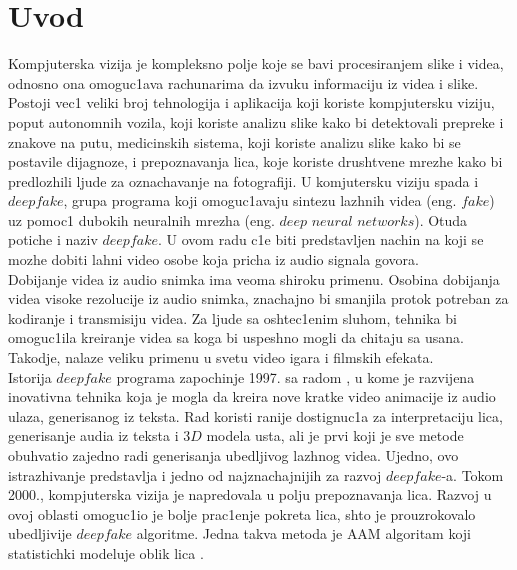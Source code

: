 \documentclass[a4paper, openany, oneside, 11pt]{book}
\begin{document}
\chapter*{Uvod} 
Kompjuterska vizija je kompleksno polje koje se bavi procesiranjem slike i videa, odnosno ona omoguc1ava rachunarima da izvuku informaciju iz videa i slike. Postoji vec1 veliki broj tehnologija i aplikacija koji koriste kompjutersku viziju, poput autonomnih vozila, koji koriste analizu slike kako bi detektovali prepreke i znakove na putu, medicinskih sistema, koji koriste analizu slike kako bi se postavile dijagnoze, i prepoznavanja lica, koje koriste drushtvene mrezhe kako bi predlozhili ljude za oznachavanje na fotografiji. U komjutersku viziju spada i $deepfake$, grupa programa koji omoguc1avaju sintezu lazhnih videa (eng. $fake$) uz pomoc1 dubokih neuralnih mrezha (eng. $deep$ $neural$ $networks$). Otuda potiche i naziv $deepfake$. U ovom radu c1e biti predstavljen nachin na koji se mozhe dobiti lahni video osobe koja pricha iz audio signala govora.\\
Dobijanje videa iz audio snimka ima veoma shiroku primenu. Osobina dobijanja videa visoke rezolucije iz audio snimka, znachajno bi smanjila protok potreban za kodiranje i transmisiju videa. Za ljude sa oshtec1enim sluhom, tehnika bi omoguc1ila kreiranje videa sa koga bi uspeshno mogli da chitaju sa usana. Takodje, nalaze veliku primenu u svetu video igara i filmskih efekata.\\
Istorija $deepfake$ programa zapochinje 1997. sa radom \cite{deepfake1}, u kome je razvijena inovativna tehnika koja je mogla da kreira nove kratke video animacije iz audio ulaza, generisanog iz teksta. Rad koristi ranije dostignuc1a za interpretaciju lica, generisanje audia iz teksta i $3D$ modela usta, ali je prvi koji je sve metode obuhvatio zajedno radi generisanja ubedljivog lazhnog videa. Ujedno, ovo istrazhivanje predstavlja i jedno od najznachajnijih za razvoj $deepfake$-a. Tokom 2000., kompjuterska vizija je napredovala u polju prepoznavanja lica. Razvoj u ovoj oblasti omoguc1io je bolje prac1enje pokreta lica, shto je prouzrokovalo ubedljivije $deepfake$ algoritme. Jedna takva metoda je \acrshort{AAM} algoritam koji statistichki modeluje oblik lica \cite{AAM}.\\ 
\end{document}
